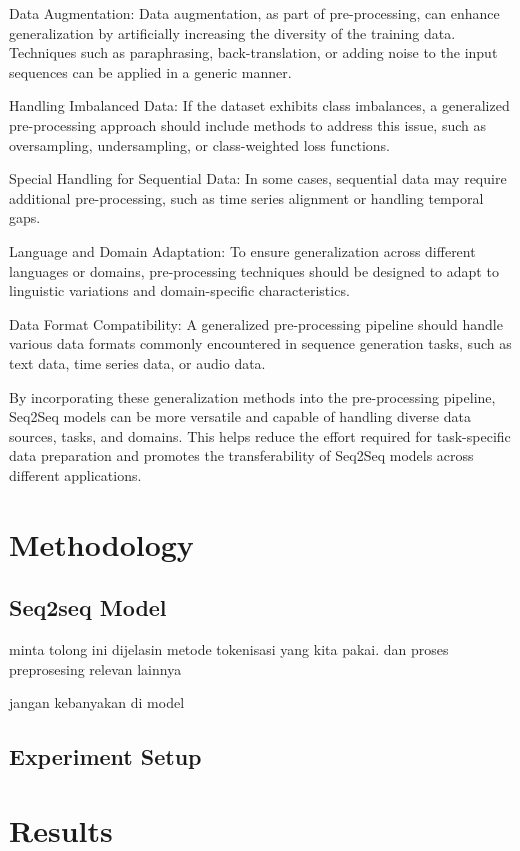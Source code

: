\documentclass[conference]{IEEEtran}
\begin{document}
    Data Augmentation: Data augmentation, as part of pre-processing, can enhance generalization by artificially increasing the diversity of the training data. Techniques such as paraphrasing, back-translation, or adding noise to the input sequences can be applied in a generic manner.

    Handling Imbalanced Data: If the dataset exhibits class imbalances, a generalized pre-processing approach should include methods to address this issue, such as oversampling, undersampling, or class-weighted loss functions.

    Special Handling for Sequential Data: In some cases, sequential data may require additional pre-processing, such as time series alignment or handling temporal gaps.

    Language and Domain Adaptation: To ensure generalization across different languages or domains, pre-processing techniques should be designed to adapt to linguistic variations and domain-specific characteristics.

    Data Format Compatibility: A generalized pre-processing pipeline should handle various data formats commonly encountered in sequence generation tasks, such as text data, time series data, or audio data.

By incorporating these generalization methods into the pre-processing pipeline, Seq2Seq models can be more versatile and capable of handling diverse data sources, tasks, and domains. This helps reduce the effort required for task-specific data preparation and promotes the transferability of Seq2Seq models across different applications.


\section{Methodology}

\subsection{Seq2seq Model}

minta tolong ini dijelasin metode tokenisasi yang kita pakai. dan proses preprosesing relevan lainnya

jangan kebanyakan di model

\subsection{Experiment Setup}


\section{Results}
\end{document}
